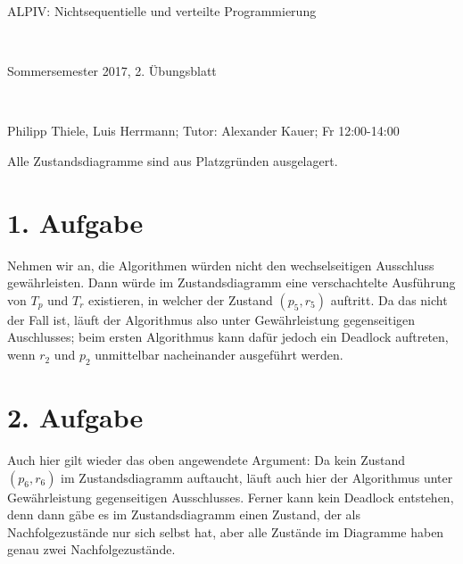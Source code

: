 \documentclass[numbers=noendperiod]{scrartcl}
\begin{document}
	
	
\hrulefill
\begin{center}
	\bfseries %
	\sffamily %
	\begin{huge}
		ALPIV: Nichtsequentielle und verteilte Programmierung
	\end{huge}\\
	\begin{Large}
		Sommersemester 2017, 2. Übungsblatt
	\end{Large}\\
	\begin{small}
		Philipp Thiele, Luis Herrmann; Tutor: Alexander Kauer; Fr 12:00-14:00
	\end{small}
	
	\vspace{-10pt}
\end{center}
\hrulefill

\newcommand{\inputmintedframed}[2]{
	\begin{mdframed}[linecolor=bg,backgroundcolor=bg]
		\inputminted[mathescape,breaklines,linenos,numbersep=5pt,tabsize=3]{#1}{#2}
\end{mdframed}}

Alle Zustandsdiagramme sind aus Platzgründen ausgelagert.

\section*{1. Aufgabe}
Nehmen wir an, die Algorithmen würden nicht den wechselseitigen Ausschluss gewährleisten. Dann würde im Zustandsdiagramm eine verschachtelte Ausführung von $T_p$ und $T_r$ existieren, in welcher der Zustand $(p_5,r_5)$ auftritt. Da das nicht der Fall ist, läuft der Algorithmus also unter Gewährleistung gegenseitigen Auschlusses; beim ersten Algorithmus kann dafür jedoch ein Deadlock auftreten, wenn $r_2$ und $p_2$ unmittelbar nacheinander ausgeführt werden.

\section*{2. Aufgabe}

Auch hier gilt wieder das oben angewendete Argument: Da kein Zustand $(p_6,r_6)$ im Zustandsdiagramm auftaucht, läuft auch hier der Algorithmus unter Gewährleistung gegenseitigen Ausschlusses. Ferner kann kein Deadlock entstehen, denn dann gäbe es im Zustandsdiagramm einen Zustand, der als Nachfolgezustände nur sich selbst hat, aber alle Zustände im Diagramme haben genau zwei Nachfolgezustände.
\end{document}
